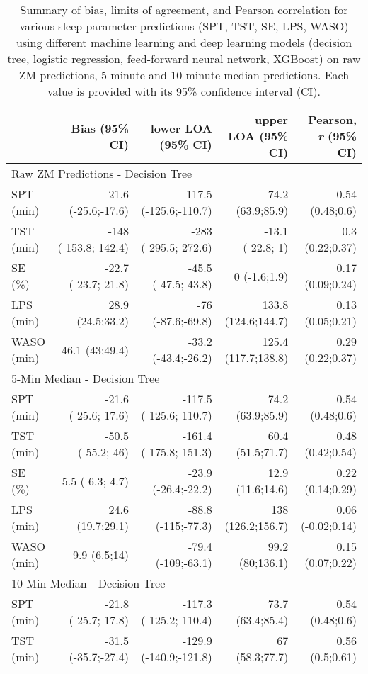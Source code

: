 \documentclass[
  10pt,
]{scrbook}
\begin{document}
\hypertarget{tbl-13}{}
\begin{longtable}{lrrrr}
\caption{\label{tbl-13}Summary of bias, limits of agreement, and Pearson correlation for
various sleep parameter predictions (SPT, TST, SE, LPS, WASO) using
different machine learning and deep learning models (decision tree,
logistic regression, feed-forward neural network, XGBoost) on raw ZM
predictions, 5-minute and 10-minute median predictions. Each value is
provided with its 95\% confidence interval (CI). }\tabularnewline

\toprule
 & Bias (95\% CI) & lower LOA (95\% CI) & upper LOA (95\% CI) & Pearson, \emph{r} (95\% CI) \\ 
\midrule
\multicolumn{5}{l}{Raw ZM Predictions - Decision Tree} \\ 
\midrule
SPT (min) & -21.6 (-25.6;-17.6) & -117.5 (-125.6;-110.7) & 74.2 (63.9;85.9) & 0.54 (0.48;0.6) \\ 
TST (min) & -148 (-153.8;-142.4) & -283 (-295.5;-272.6) & -13.1 (-22.8;-1) & 0.3 (0.22;0.37) \\ 
SE (\%) & -22.7 (-23.7;-21.8) & -45.5 (-47.5;-43.8) & 0 (-1.6;1.9) & 0.17 (0.09;0.24) \\ 
LPS (min) & 28.9 (24.5;33.2) & -76 (-87.6;-69.8) & 133.8 (124.6;144.7) & 0.13 (0.05;0.21) \\ 
WASO (min) & 46.1 (43;49.4) & -33.2 (-43.4;-26.2) & 125.4 (117.7;138.8) & 0.29 (0.22;0.37) \\ 
\midrule
\multicolumn{5}{l}{5-Min Median - Decision Tree} \\ 
\midrule
SPT (min) & -21.6 (-25.6;-17.6) & -117.5 (-125.6;-110.7) & 74.2 (63.9;85.9) & 0.54 (0.48;0.6) \\ 
TST (min) & -50.5 (-55.2;-46) & -161.4 (-175.8;-151.3) & 60.4 (51.5;71.7) & 0.48 (0.42;0.54) \\ 
SE (\%) & -5.5 (-6.3;-4.7) & -23.9 (-26.4;-22.2) & 12.9 (11.6;14.6) & 0.22 (0.14;0.29) \\ 
LPS (min) & 24.6 (19.7;29.1) & -88.8 (-115;-77.3) & 138 (126.2;156.7) & 0.06 (-0.02;0.14) \\ 
WASO (min) & 9.9 (6.5;14) & -79.4 (-109;-63.1) & 99.2 (80;136.1) & 0.15 (0.07;0.22) \\ 
\midrule
\multicolumn{5}{l}{10-Min Median - Decision Tree} \\ 
\midrule
SPT (min) & -21.8 (-25.7;-17.8) & -117.3 (-125.2;-110.4) & 73.7 (63.4;85.4) & 0.54 (0.48;0.6) \\ 
TST (min) & -31.5 (-35.7;-27.4) & -129.9 (-140.9;-121.8) & 67 (58.3;77.7) & 0.56 (0.5;0.61) \\ 

\end{longtable}
\end{document}
